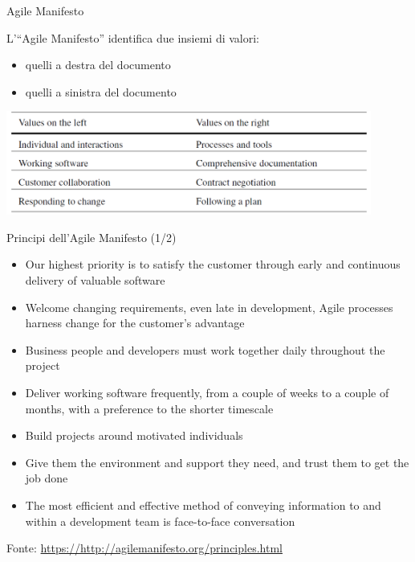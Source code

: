 \documentclass{beamer}
\begin{document}
\begin{frame}{\centerline{Agile Manifesto}}


L'``Agile Manifesto'' identifica due insiemi di valori:
\begin{itemize}
    \item quelli a destra del documento
    \item quelli a sinistra del documento
\end{itemize}

\begin{center}
\includegraphics[width=120mm]{A2022.IDSEPC.ProcessoDiProduzione/img-img01.png}
\end{center}
\end{frame}

\begin{frame}{\centerline{Principi dell'Agile Manifesto (1/2)}}

\begin{itemize}
\item  Our highest priority is to satisfy the customer through early and continuous delivery of valuable software
\item  Welcome changing requirements, even late in development, Agile processes harness change for the customer's advantage
\item  Business people and developers must work together daily throughout the project
\item  Deliver working software frequently, from a couple of weeks to a couple of months, with a preference to the shorter timescale
\item  Build projects around motivated individuals
\item  Give them the environment and support they need, and trust them to get the job done
\item  The most efficient and effective method of conveying information to and within a development team is face-to-face conversation
\end{itemize}

\begin{center}
\tiny
Fonte: \url{https://http://agilemanifesto.org/principles.html}
\end{center}

\end{frame}
\end{document}
